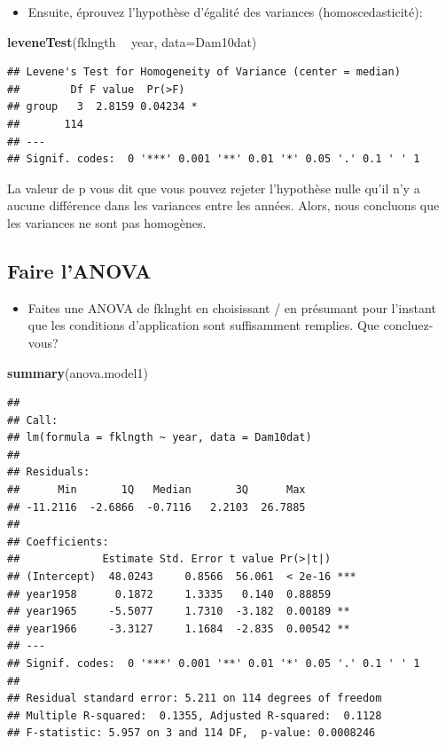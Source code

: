 \documentclass[12pt,]{book}
\newenvironment{Shaded}{\begin{snugshade}}{\end{snugshade}}
\newcommand{\DataTypeTok}[1]{\textcolor[rgb]{0.27,0.27,0.27}{#1}}
\newcommand{\KeywordTok}[1]{\textcolor[rgb]{0.27,0.27,0.27}{\textbf{#1}}}
\newcommand{\NormalTok}[1]{#1}
\newcommand{\OperatorTok}[1]{\textcolor[rgb]{0.43,0.43,0.43}{\textbf{#1}}}
\newcommand{\StringTok}[1]{\textcolor[rgb]{0.5,0.5,0.5}{#1}}
\providecommand{\tightlist}{%
  \setlength{\itemsep}{0pt}\setlength{\parskip}{0pt}}
\begin{document}
\begin{itemize}
\tightlist
\item
  Ensuite, éprouvez l'hypothèse d'égalité des variances (homoscedasticité):
\end{itemize}

\begin{Shaded}
\begin{Highlighting}[]
\KeywordTok{leveneTest}\NormalTok{(fklngth }\OperatorTok{~}\StringTok{ }\NormalTok{year, }\DataTypeTok{data=}\NormalTok{Dam10dat)}
\end{Highlighting}
\end{Shaded}

\begin{verbatim}
## Levene's Test for Homogeneity of Variance (center = median)
##        Df F value  Pr(>F)  
## group   3  2.8159 0.04234 *
##       114                  
## ---
## Signif. codes:  0 '***' 0.001 '**' 0.01 '*' 0.05 '.' 0.1 ' ' 1
\end{verbatim}

La valeur de p vous dit que vous pouvez rejeter l'hypothèse nulle qu'il n'y a aucune différence dans les variances entre les années. Alors, nous concluons que les variances ne sont pas homogènes.

\hypertarget{faire-lanova}{%
\subsection{Faire l'ANOVA}\label{faire-lanova}}

\begin{itemize}
\tightlist
\item
  Faites une ANOVA de fklnght en choisissant / en présumant pour l'instant que les conditions d'application sont suffisamment remplies. Que concluez-vous?
\end{itemize}

\begin{Shaded}
\begin{Highlighting}[]
\KeywordTok{summary}\NormalTok{(anova.model1)}
\end{Highlighting}
\end{Shaded}

\begin{verbatim}
## 
## Call:
## lm(formula = fklngth ~ year, data = Dam10dat)
## 
## Residuals:
##      Min       1Q   Median       3Q      Max 
## -11.2116  -2.6866  -0.7116   2.2103  26.7885 
## 
## Coefficients:
##             Estimate Std. Error t value Pr(>|t|)    
## (Intercept)  48.0243     0.8566  56.061  < 2e-16 ***
## year1958      0.1872     1.3335   0.140  0.88859    
## year1965     -5.5077     1.7310  -3.182  0.00189 ** 
## year1966     -3.3127     1.1684  -2.835  0.00542 ** 
## ---
## Signif. codes:  0 '***' 0.001 '**' 0.01 '*' 0.05 '.' 0.1 ' ' 1
## 
## Residual standard error: 5.211 on 114 degrees of freedom
## Multiple R-squared:  0.1355,	Adjusted R-squared:  0.1128 
## F-statistic: 5.957 on 3 and 114 DF,  p-value: 0.0008246
\end{verbatim}
\end{document}
